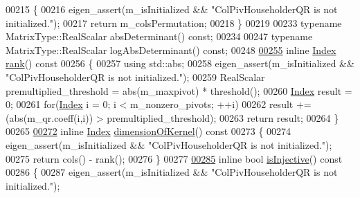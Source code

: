 \begin{DoxyCode}
00215 \textcolor{keyword}{    }\{
00216       eigen\_assert(m\_isInitialized && \textcolor{stringliteral}{"ColPivHouseholderQR is not initialized."});
00217       \textcolor{keywordflow}{return} m\_colsPermutation;
00218     \}
00219 
00233     \textcolor{keyword}{typename} MatrixType::RealScalar absDeterminant() \textcolor{keyword}{const};
00234 
00247     \textcolor{keyword}{typename} MatrixType::RealScalar logAbsDeterminant() \textcolor{keyword}{const};
00248 
\hyperlink{group___q_r___module_a2a59aaa689613ce5ef0c9130ad33940e}{00255}     \textcolor{keyword}{inline} \hyperlink{namespace_eigen_a62e77e0933482dafde8fe197d9a2cfde}{Index} \hyperlink{group___q_r___module_a2a59aaa689613ce5ef0c9130ad33940e}{rank}()\textcolor{keyword}{ const}
00256 \textcolor{keyword}{    }\{
00257       \textcolor{keyword}{using} std::abs;
00258       eigen\_assert(m\_isInitialized && \textcolor{stringliteral}{"ColPivHouseholderQR is not initialized."});
00259       RealScalar premultiplied\_threshold = abs(m\_maxpivot) * threshold();
00260       \hyperlink{namespace_eigen_a62e77e0933482dafde8fe197d9a2cfde}{Index} result = 0;
00261       \textcolor{keywordflow}{for}(\hyperlink{namespace_eigen_a62e77e0933482dafde8fe197d9a2cfde}{Index} i = 0; i < m\_nonzero\_pivots; ++i)
00262         result += (abs(m\_qr.coeff(i,i)) > premultiplied\_threshold);
00263       \textcolor{keywordflow}{return} result;
00264     \}
00265 
\hyperlink{group___q_r___module_a7c9294565d179226133770160b827be1}{00272}     \textcolor{keyword}{inline} \hyperlink{namespace_eigen_a62e77e0933482dafde8fe197d9a2cfde}{Index} \hyperlink{group___q_r___module_a7c9294565d179226133770160b827be1}{dimensionOfKernel}()\textcolor{keyword}{ const}
00273 \textcolor{keyword}{    }\{
00274       eigen\_assert(m\_isInitialized && \textcolor{stringliteral}{"ColPivHouseholderQR is not initialized."});
00275       \textcolor{keywordflow}{return} cols() - rank();
00276     \}
00277 
\hyperlink{group___q_r___module_a0031998053c9c7345c9458f7443aa263}{00285}     \textcolor{keyword}{inline} \textcolor{keywordtype}{bool} \hyperlink{group___q_r___module_a0031998053c9c7345c9458f7443aa263}{isInjective}()\textcolor{keyword}{ const}
00286 \textcolor{keyword}{    }\{
00287       eigen\_assert(m\_isInitialized && \textcolor{stringliteral}{"ColPivHouseholderQR is not initialized."});

\end{DoxyCode}
